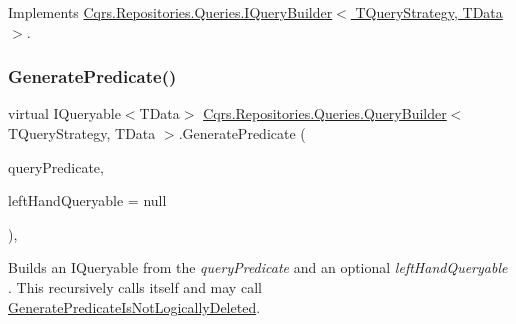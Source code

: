 Implements \hyperlink{interfaceCqrs_1_1Repositories_1_1Queries_1_1IQueryBuilder_ab903955b6fb1843a3e168b33252161a5_ab903955b6fb1843a3e168b33252161a5}{Cqrs.\+Repositories.\+Queries.\+I\+Query\+Builder$<$ T\+Query\+Strategy, T\+Data $>$}.

\mbox{\label{classCqrs_1_1Repositories_1_1Queries_1_1QueryBuilder_a553ad69e77d37f28b40e6c9d8e98b716_a553ad69e77d37f28b40e6c9d8e98b716}} 
\subsubsection{\texorpdfstring{Generate\+Predicate()}{GeneratePredicate()}\hspace{0.1cm}{\footnotesize\ttfamily [1/2]}}
{\footnotesize\ttfamily virtual I\+Queryable$<$T\+Data$>$ \hyperlink{classCqrs_1_1Repositories_1_1Queries_1_1QueryBuilder}{Cqrs.\+Repositories.\+Queries.\+Query\+Builder}$<$ T\+Query\+Strategy, T\+Data $>$.Generate\+Predicate (\begin{DoxyParamCaption}\item[{\hyperlink{interfaceCqrs_1_1Repositories_1_1Queries_1_1IQueryPredicate}{I\+Query\+Predicate}}]{query\+Predicate,  }\item[{I\+Queryable$<$ T\+Data $>$}]{left\+Hand\+Queryable = {\ttfamily null} }\end{DoxyParamCaption})\hspace{0.3cm}{\ttfamily [protected]}, {\ttfamily [virtual]}}



Builds an I\+Queryable from the {\itshape query\+Predicate}  and an optional {\itshape left\+Hand\+Queryable} . This recursively calls itself and may call \hyperlink{classCqrs_1_1Repositories_1_1Queries_1_1QueryBuilder_a6095cfcbd824578e7c70e2028e1ac6ad_a6095cfcbd824578e7c70e2028e1ac6ad}{Generate\+Predicate\+Is\+Not\+Logically\+Deleted}. 

\mbox{\label{classCqrs_1_1Repositories_1_1Queries_1_1QueryBuilder_aa38989a8b4808c7c73e7cf038b535ea7_aa38989a8b4808c7c73e7cf038b535ea7}} 

